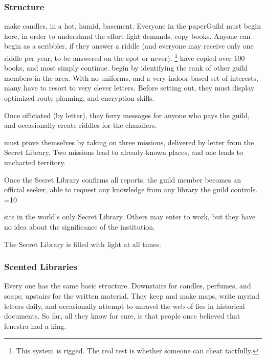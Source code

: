 \begin{multicols}{2}
\subsubsection{Structure}

\begin{description}
  make candles, in a hot, humid, basement.
  Everyone in the \gls{paperGuild} must begin here, in order to understand the effort light demands.
  copy books.
  Anyone can begin as a scribbler, if they answer a riddle (and everyone may receive only one riddle per year, to be answered on the spot or never).%
  \footnote{This system is rigged. The real test is whether someone can cheat tactfully.}
  have copied over 100 books, and most simply continue.
  \label{knowledgeWanderer}%
  begin by identifying the rank of other guild members in the area.
  With no uniforms, and a very indoor-based set of interests, many have to resort to very clever letters.
  Before setting out, they must display optimized route planning, and encryption skills.

  Once officiated (by letter), they ferry messages for anyone who pays the guild, and occasionally create riddles for the chandlers.
  \item[\Glspl{seeker}]
  must prove themselves by taking on three missions, delivered by letter from the Secret Library.
  Two missions lead to already-known places, and one leads to uncharted territory.

  Once the Secret Library confirms all reports, the guild member becomes an official \gls{seeker}, able to request any knowledge from any library the guild controls.
  \ifnum\value{season}=10
  \item[The Last Librarian]
  sits in the world's only Secret Library.
  Others may enter to work, but they have no idea about the significance of the institution.

  The Secret Library is filled with light at all times.
  \fi
\end{description}

\subsubsection{Scented Libraries}

Every one has the same basic structure.
Downstairs for candles, perfumes, and soaps; upstairs for the written material.
They keep and make maps, write myriad letters daily, and occasionally attempt to unravel the web of lies in historical documents.
So far, all they know for sure, is that people once believed that \gls{fenestra} had a king.

\end{multicols}

\ifodd\thepage\else
  \begin{figure*}[b!]
    \solarSystem
  \end{figure*}
\fi
